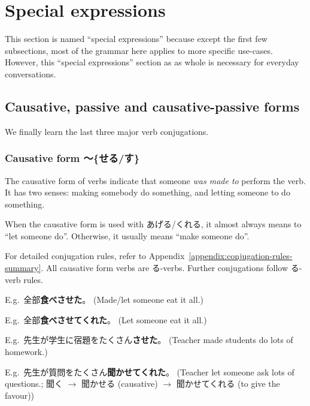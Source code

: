 \documentclass[../nihongo-gakushuu-kyouzai.tex]{subfiles}
\begin{document}
\setcounter{section}{3}
\section{Special expressions} \label{sec:special-expressions}

This section is named ``special expressions'' because except the first few subsections, most of the grammar here applies to more specific use-cases. However, this ``special expressions'' section as as whole is necessary for everyday conversations.

\subsection{Causative, passive and causative-passive forms} \label{sec:causative-passive-causative-passive-forms}
We finally learn the last three major verb conjugations.

\subsubsection{Causative form 〜\{せる/す\}} \label{sec:causative-form}
The causative form of verbs indicate that someone \emph{was made to} perform the verb. It has two senses: making somebody do something, and letting someone to do something. 

When the causative form is used with あげる/くれる, it almost always means to ``let someone do''. Otherwise, it usually means ``make someone do''.

For detailed conjugation rules, refer to Appendix~\ref{appendix:conjugation-rules-summary}. All causative form verbs are る-verbs. Further conjugations follow る-verb rules.


E.g.\ 全部\textbf{食べさせた}。 (Made/let someone eat it all.)

E.g.\ 全部\textbf{食べさせてくれた}。 (Let someone eat it all.)

E.g.\ 先生が学生に宿題をたくさん\textbf{させた}。 (Teacher made students do lots of homework.)

E.g.\ 先生が質問をたくさん\textbf{聞かせてくれた}。 (Teacher let someone ask lots of questions.; 聞く $\to$ 聞かせる (causative) $\to$ 聞かせてくれる (to give the favour))
\end{document}
